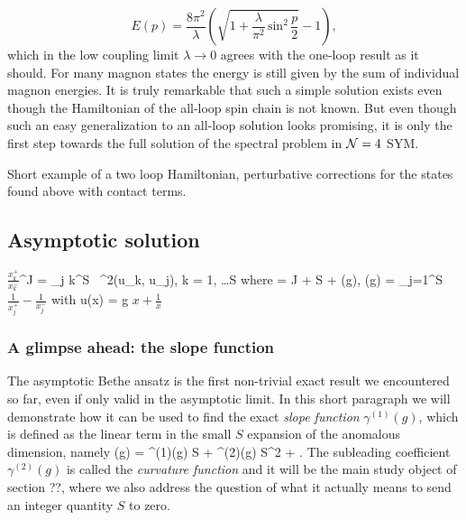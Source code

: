 \begin{equation}
	E(p) = \frac{8\pi^2}{\lambda} \left( \sqrt{1 + \frac{\lambda}{\pi^2} \, \mathrm{sin}^2 \, \frac{p}{2}} - 1 \right),
	\label{eq:ABA_e}
\end{equation}  
which in the low coupling limit $\lambda \rightarrow 0$ agrees with the one-loop result as it should. For many magnon states the energy is still given by the sum of individual magnon energies. It is truly remarkable that such a simple solution exists even though the Hamiltonian of the all-loop spin chain is not known. But even though such an easy generalization to an all-loop solution looks promising, it is only the first step towards the full solution of the spectral problem in $\mathcal{N}=4$ SYM. 

Short example of a two loop Hamiltonian, perturbative corrections for the states found above with contact terms.

\subsection{Asymptotic solution}

\beq
	\label{eq:sl2_aba}
	\( \frac{x_k^+}{x_k^-} \)^J = \prod_{j \neq k}^S  \,  \; \sigma^2(u_k, u_j), \;\;\; k = 1, \dots S
\eeq
where 
\beq
	\Delta = J + S + \gamma(g), \;\;\; \gamma(g) =  \sum_{j=1}^S \( \frac{1}{x_j^+} - \frac{1}{x_j^-} \)
\eeq
with
\beq
\label{eq:u_of_x}
u(x) = g \(x + \frac{1}{x}\)
\eeq

\subsubsection{A glimpse ahead: the slope function}

The asymptotic Bethe ansatz  is the first non-trivial exact result we encountered so far, even if only valid in the asymptotic limit. In this short paragraph we will demonstrate how it can be used to find the exact \emph{slope function} $\gamma^{(1)}(g)$, which is defined as the linear term in the small $S$ expansion of the anomalous dimension, namely
\beq
	\gamma(g) = \gamma^{(1)}(g) \; S + \gamma^{(2)}(g) \; S^2 + .
\eeq
The subleading coefficient $\gamma^{(2)}(g)$ is called the \emph{curvature function} and it will be the main study object of section ??, where we also address the question of what it actually means to send an integer quantity $S$ to zero. 

